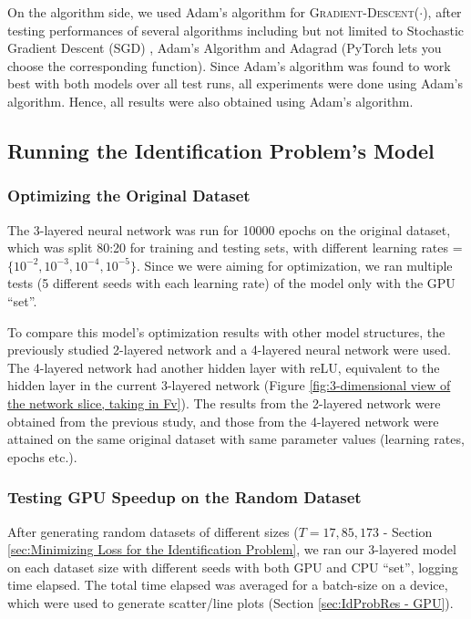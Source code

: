\documentclass[12pt]{article}
\begin{document}
    On the algorithm side, we used Adam's algorithm for \textsc{Gradient-Descent}($\cdot$), after testing performances of several algorithms including but not limited to Stochastic Gradient Descent (SGD) \cite{SGD}, Adam's Algorithm \cite{Adam} and Adagrad \cite{Adagrad} (PyTorch lets you choose the corresponding function). Since Adam's algorithm was found to work best with both models over all test runs, all experiments were done using Adam's algorithm. Hence, all results were also obtained using Adam's algorithm.
    
    \subsection{Running the Identification Problem's Model} \label{sec:Running the Identification Problem's Model}
    \subsubsection{Optimizing the Original Dataset} \label{sec:Identification Problem-Optimizing the Original Dataset}
    The 3-layered neural network was run for 10000 epochs on the original dataset, which was split 80:20 for training and testing sets, with different learning rates = $\{10^{-2}, 10^{-3}, 10^{-4}, 10^{-5}\}$. Since we were aiming for optimization, we ran multiple tests (5 different seeds with each learning rate) of the model only with the GPU ``set''.
    
    To compare this model's optimization results with other model structures, the previously studied 2-layered network \cite{Xue2016Avi2} and a 4-layered neural network were used. The 4-layered network had another hidden layer with reLU, equivalent to the hidden layer in the current 3-layered network (Figure \ref{fig:3-dimensional view of the network slice, taking in Fv}). The results from the 2-layered network were obtained from the previous study, and those from the 4-layered network were attained on the same original dataset with same parameter values (learning rates, epochs etc.).
    
    \subsubsection{Testing GPU Speedup on the Random Dataset} \label{sec:Identification Problem-Testing GPU Speedup on the Random Dataset}
    After generating random datasets of different sizes ($T = 17, 85, 173$ - Section \ref{sec:Minimizing Loss for the Identification Problem}, we ran our 3-layered model on each dataset size with different seeds with both GPU and CPU ``set'', logging time elapsed. The total time elapsed was averaged for a batch-size on a device, which were used to generate scatter/line plots (Section \ref{sec:IdProbRes - GPU}).
    
\end{document}
